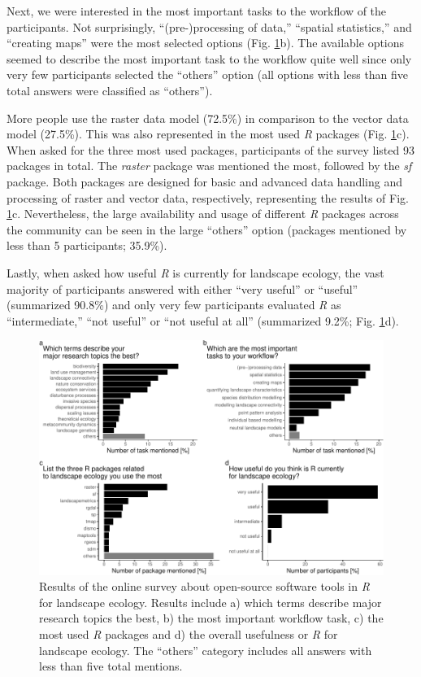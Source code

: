 \documentclass[smallextended]{svjour3}       %
\begin{document}
Next, we were interested in the most important tasks to the workflow of the participants.
Not surprisingly, ``(pre-)processing of data,'' ``spatial statistics,'' and ``creating maps'' were the most selected options (Fig. \ref{fig:fig-survey}b).
The available options seemed to describe the most important task to the workflow quite well since only very few participants selected the ``others'' option (all options with less than five total answers were classified as ``others'').

More people use the raster data model (72.5\%) in comparison to the vector data model (27.5\%).
This was also represented in the most used \textit{R} packages (Fig. \ref{fig:fig-survey}c).
When asked for the three most used packages, participants of the survey listed 93 packages in total.
The \textit{raster} package was mentioned the most, followed by the \textit{sf} package.
Both packages are designed for basic and advanced data handling and processing of raster and vector data, respectively, representing the results of Fig. \ref{fig:fig-survey}c.
Nevertheless, the large availability and usage of different \textit{R} packages across the community can be seen in the large ``others'' option (packages mentioned by less than 5 participants; 35.9\%).

Lastly, when asked how useful \textit{R} is currently for landscape ecology, the vast majority of participants answered with either ``very useful'' or ``useful'' (summarized 90.8\%) and only very few participants evaluated \textit{R} as ``intermediate,'' ``not useful'' or ``not useful at all'' (summarized 9.2\%; Fig. \ref{fig:fig-survey}d).



\begin{figure}

{\centering \includegraphics[width=\textwidth]{Manuscript_files/figure-latex/fig-survey-1} 

}

\caption{Results of the online survey about open-source software tools in \textit{R} for landscape ecology. Results include a) which terms describe major research topics the best, b) the most important workflow task, c) the most used \textit{R} packages and d) the overall usefulness or \textit{R} for landscape ecology. The ``others'' category includes all answers with less than five total mentions.}\label{fig:fig-survey}
\end{figure}
\end{document}
